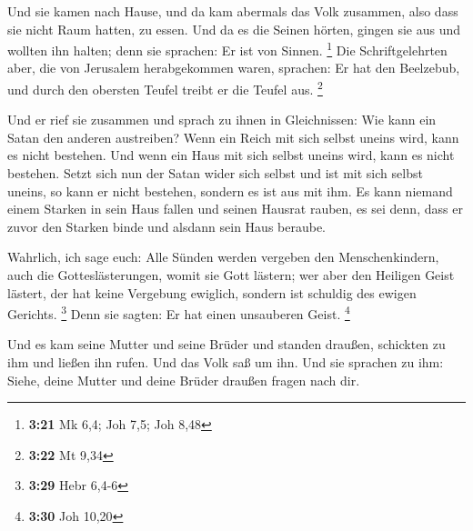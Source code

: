  Und sie kamen nach Hause, und da kam abermals das Volk
zusammen, also dass sie nicht Raum hatten, zu essen.  Und
da es die Seinen hörten, gingen sie aus und wollten ihn halten; denn sie
sprachen: Er ist von Sinnen. \footnote{\textbf{3:21} Mk 6,4; Joh 7,5;
  Joh 8,48}  Die Schriftgelehrten aber, die von Jerusalem
herabgekommen waren, sprachen: Er hat den Beelzebub, und durch den
obersten Teufel treibt er die Teufel aus. \footnote{\textbf{3:22} Mt
  9,34}

 Und er rief sie zusammen und sprach zu ihnen in
Gleichnissen: Wie kann ein Satan den anderen austreiben? 
Wenn ein Reich mit sich selbst uneins wird, kann es nicht bestehen.
 Und wenn ein Haus mit sich selbst uneins wird, kann es
nicht bestehen.  Setzt sich nun der Satan wider sich
selbst und ist mit sich selbst uneins, so kann er nicht bestehen,
sondern es ist aus mit ihm.  Es kann niemand einem
Starken in sein Haus fallen und seinen Hausrat rauben, es sei denn, dass
er zuvor den Starken binde und alsdann sein Haus beraube.

 Wahrlich, ich sage euch: Alle Sünden werden vergeben den
Menschenkindern, auch die Gotteslästerungen, womit sie Gott lästern;
 wer aber den Heiligen Geist lästert, der hat keine
Vergebung ewiglich, sondern ist schuldig des ewigen Gerichts.
\footnote{\textbf{3:29} Hebr 6,4-6}  Denn sie sagten: Er
hat einen unsauberen Geist. \footnote{\textbf{3:30} Joh 10,20}

 Und es kam seine Mutter und seine Brüder und standen
draußen, schickten zu ihm und ließen ihn rufen.  Und das
Volk saß um ihn. Und sie sprachen zu ihm: Siehe, deine Mutter und deine
Brüder draußen fragen nach dir.

